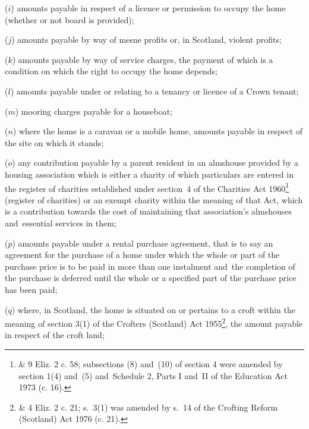 \documentclass[12pt,a4paper]{article}
\begin{document}
\begin{enumerate}
($i$) 
amounts payable  %
in respect of a licence or permission to occupy the home (whether or not board is provided);

($j$) 
amounts payable  %
by way of mesne profits or, in Scotland, violent profits;%

($k$) 
amounts payable by way of  %
service charges, the payment of which is a condition on which the right to occupy the home depends;

($l$) 
amounts payable  %
under or relating to a tenancy or licence of a Crown tenant;

($m$) mooring charges payable for a houseboat;

($n$) where the home is a caravan or a mobile home, 
amounts payable  %
in respect of the site on which it stands;

($o$) any contribution payable by a parent resident in an almshouse provided by a housing association which is either a charity of which particulars are entered in the register of charities established under section~4 of the Charities Act 1960\footnote{ \& 9 Eliz. 2 c. 58; subsections (8) and~(10) of section 4 were amended by section 1(4) and~(5) and~Schedule 2, Parts I and~II of the Education Act 1973 (c. 16).} (register of charities) or an exempt charity within the meaning of that Act, which is a contribution towards the cost of maintaining that association’s almshouses and~essential services in them;%

($p$) 
amounts payable  %
under a rental purchase agreement, that is to say an agreement for the purchase of a home under which the whole or part of the purchase price is to be paid in more than one instalment and~the completion of the purchase is deferred until the whole or a specified part of the purchase price has been paid;

($q$) where, in Scotland, the home is situated on or pertains to a croft within the meaning of section 3(1) of the Crofters (Scotland) Act 1955\footnote{ \& 4 Eliz. 2 c. 21; s.~3(1) was amended by s.~14 of the Crofting Reform (Scotland) Act 1976 (c. 21).}, the 
amount payable  %
in respect of the croft land;


\end{enumerate}
\end{document}
